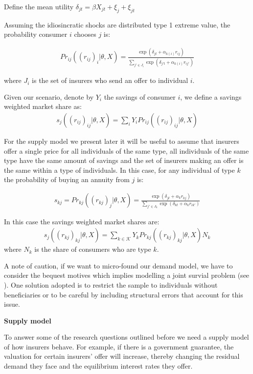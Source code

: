 \documentclass[12pt]{article}
\theoremstyle{plain}
\theoremstyle{plain}
\begin{document}
Define the mean utility $\delta_{jt} = \beta X_{jt} + \xi_j + \xi_{jt}$

Assuming the idiosincratic shocks are distributed type 1 extreme value, the probability consumer $i$ chooses $j$ is: 

\begin{align*}
    Pr_{ij}((r_{ij})_{i}|\theta, X) = \frac{\exp(\delta_{jt} + \alpha_{k(i)}r_{ij})}{\sum_{j'\in J_i}\exp(\delta_{j't} + \alpha_{k(i)}r_{ij'})}
\end{align*}

where $J_i$ is the set of insurers who send an offer to individual $i$. 

Given our scenario, denote by $Y_i$ the savings of consumer $i$, we define a savings weighted market share as: 
\begin{align}
    s_j((r_{ij})_{ij}|\theta, X) = \sum_i Y_i Pr_{ij}((r_{ij})_{ij}|\theta, X)
\end{align}

For the supply model we present later it will be useful to assume that insurers offer a single price for all individuals of the same type, all individuals of the same type have the same amount of savings and the set of insurers making an offer is the same within a type of individuals. In this case, for any individual of type $k$ the probability of buying an annuity from $j$ is: 


\begin{align*}
    s_{kj} = Pr_{kj}((r_{kj})_{j}|\theta, X) = \frac{\exp(\delta_{jt} + \alpha_{k}r_{kj})}{\sum_{j'\in J_k}\exp(\delta_{kt} + \alpha_kr_{ik'})}
\end{align*}



In this case the savings weighted market shares are: 
\begin{align}
    s_j((r_{kj})_{kj}|\theta, X) = \sum_{k  \in \mathcal{K}} Y_k Pr_{kj}((r_{kj})_{kj}|\theta, X)N_k
\end{align}
where $N_k$ is the share of consumers who are type $k$. 

A note of caution, if we want to micro-found our demand model, we have to consider the bequest motives which implies modelling a joint survial problem (see \textcite{illanes_switching_2017}). One solution adopted is to restrict the sample to individuals without beneficiaries or to be careful by including structural errors that account for this issue. 


\textbf{Supply model}

To answer some of the research questions outlined before we need a supply model of how insurers behave. For example, if there is a government guarantee, the valuation for certain insurers' offer will increase, thereby changing the residual demand they face and the equilibrium interest rates they offer. 
\end{document}
